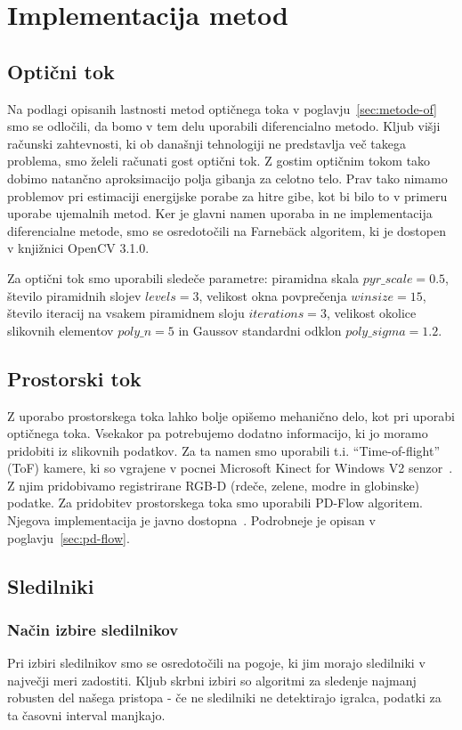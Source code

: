 \section{Implementacija metod}
\subsection{Optični tok}
Na podlagi opisanih lastnosti metod optičnega toka v poglavju~\ref{sec:metode-of} smo se odločili, da bomo v tem delu uporabili diferencialno metodo. Kljub višji računski zahtevnosti, ki ob današnji tehnologiji ne predstavlja več takega problema, smo želeli računati gost optični tok. Z gostim optičnim tokom tako dobimo natančno aproksimacijo polja gibanja za celotno telo. Prav tako nimamo problemov pri estimaciji energijske porabe za hitre gibe, kot bi bilo to v primeru uporabe ujemalnih metod. Ker je glavni namen uporaba in ne implementacija diferencialne metode, smo se osredotočili na Farneb{\"a}ck algoritem, ki je dostopen v knjižnici OpenCV 3.1.0.

Za optični tok smo uporabili sledeče parametre: piramidna skala $pyr\_scale=0.5$, število piramidnih slojev $levels=3$, velikost okna povprečenja $winsize=15$, število iteracij na vsakem piramidnem sloju $iterations=3$, velikost okolice slikovnih elementov $poly\_n=5$ in Gaussov standardni odklon $poly\_sigma=1.2$.

\subsection{Prostorski tok}
Z uporabo prostorskega toka lahko bolje opišemo mehanično delo, kot pri uporabi optičnega toka. Vsekakor pa potrebujemo dodatno informacijo, ki jo moramo pridobiti iz slikovnih podatkov. Za ta namen smo uporabili t.i. ``Time-of-flight'' (ToF) kamere, ki so vgrajene v pocnei Microsoft Kinect for Windows V2 senzor~\cite{Yang2015KinectV2}. Z njim pridobivamo registrirane RGB-D (rdeče, zelene, modre in globinske) podatke. Za pridobitev prostorskega toka smo uporabili PD-Flow algoritem. Njegova implementacija je javno dostopna~\cite{jaimez2015primal}. Podrobneje je opisan v poglavju~\ref{sec:pd-flow}.



\subsection{Sledilniki}
\subsubsection{Način izbire sledilnikov}\label{sec:pogoji-sledilnikov}
Pri izbiri sledilnikov smo se osredotočili na pogoje, ki jim morajo sledilniki v največji meri zadostiti. Kljub skrbni izbiri so algoritmi za sledenje najmanj robusten del našega pristopa - če ne sledilniki ne detektirajo igralca, podatki za ta časovni interval manjkajo.

